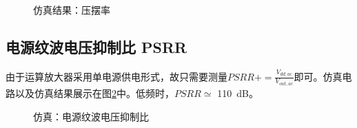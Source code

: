 \documentclass[UTF8]{ctexart}
\numberwithin{figure}{subsection}
\numberwithin{table}{subsection}
\numberwithin{equation}{subsection}
\begin{document}
\begin{figure}[H]
    \centering
    \caption{仿真结果：压摆率}
    \label{SR sim result}
\end{figure}


\subsection{电源纹波电压抑制比 PSRR}
由于运算放大器采用单电源供电形式，故只需要测量\(PSRR+ = \frac{V_{dd,ac}}{V_{out,ac}}\)即可。仿真电路以及仿真结果展示在图\ref{PSRR simulation}中。低频时，\(PSRR \simeq \) \SI[]{110}{\dB}。

\begin{figure}[H]
    \centering
    \caption{仿真：电源纹波电压抑制比}
    \label{PSRR simulation}
\end{figure}
\end{document}
